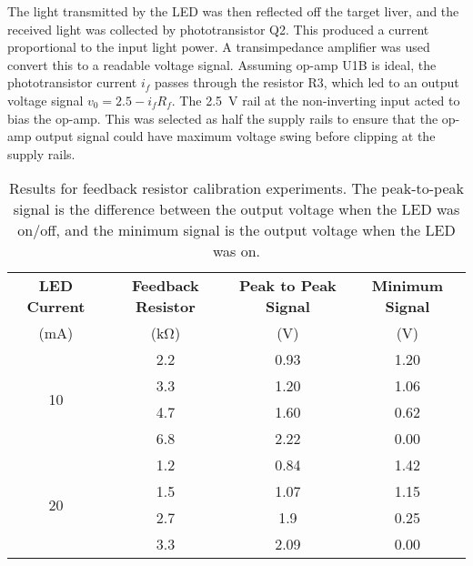 The light transmitted by the LED was then reflected off the target liver, and the received light was collected by phototransistor Q2. This produced a current proportional to the input light power. A transimpedance amplifier was used convert this to a readable voltage signal. Assuming op-amp U1B is ideal, the phototransistor current $i_f$ passes through the resistor R3, which led to an output voltage signal $v_0 = 2.5 - i_f R_f$. The \SI{2.5}{\volt} rail at the non-inverting input acted to bias the op-amp. This was selected as half the supply rails to ensure that the op-amp output signal could have maximum voltage swing before clipping at the supply rails.\\

\begin{table}[htb]
	\centering
	\caption{Results for feedback resistor calibration experiments. The peak-to-peak signal is the difference between the output voltage when the LED was on/off, and the minimum signal is the output voltage when the LED was on.}
	\label{tab: tia feedback resistor}
	\begin{tabular}{|c|c|c|c|}
		\hline
		\textbf{LED Current} & \textbf{Feedback Resistor} & \textbf{Peak to Peak Signal} & \textbf{Minimum Signal}\\
		(mA)	&	(\si{\kilo\ohm})	&	(V)	&	(V)\\
		\hline
		\multirow{4}{*}{10}	&	2.2	&	0.93	&	1.20\\
						\cline{2-4}
						&	3.3	&	1.20	&	1.06\\
						\cline{2-4}
						&	4.7	&	1.60	&	0.62\\
						\cline{2-4}
						&	6.8	&	2.22	&	0.00\\
		\hline
		\multirow{4}{*}{20}	&	1.2	&	0.84	&	1.42\\
						\cline{2-4}
						&	1.5	&	1.07	&	1.15\\
						\cline{2-4}
						&	2.7	&	1.9	&	0.25\\
						\cline{2-4}
						&	3.3	&	2.09	&	0.00\\
		\hline
	\end{tabular}
\end{table}

